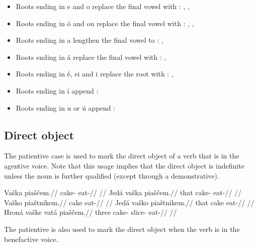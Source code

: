 \begin{itemize}
	\item Roots ending in e and o replace the final vowel with :  ,  ,  
	\item Roots ending in \'o and ou replace the final vowel with :  ,  ,  
	\item Roots ending in a lengthen the final vowel to :  ,  
	\item Roots ending in \'a replace the final vowel with :  ,  
	\item Roots ending in \'e, ei and i replace the root with :  ,  
	\item Roots ending in \'i append :
	\item Roots ending in u or \'u append :
\end{itemize}

\subsection{Direct object}
The patientive case is used to mark the direct object of a verb that is in the agentive voice. Note that this usage implies that the direct object is indefinite unless the noun is further qualified (except through a demonstrative).

\pex
\a
\begingl
\gla Va\v{s}ka pia\v{s}\v{c}em.//
\glb cake- eat-//
\glft {}//
\endgl
\a
\begingl
\gla Jed\'a va\v{s}ka pia\v{s}\v{c}em.//
\glb that cake- eat-//
\glft {}//
\endgl
\a
\begingl
\gla Va\v{s}ko pia\v{s}tnikem.//
\glb cake eat-//
\glft {}//
\endgl
\a
\begingl
\gla Jed\'a va\v{s}ko pia\v{s}tnikem.//
\glb that cake eat-//
\glft {}//
\endgl
\a
\begingl
\gla Hron\'a va\v{s}ke vat\'a pia\v{s}\v{c}em.//
\glb three cake- slice- eat-//
\glft {}//
\endgl
\xe

The patientive is also used to mark the direct object when the verb is in the benefactive voice.

